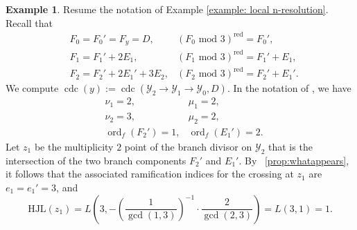 \documentclass[12pt]{amsart}
\numberwithin{equation}{section}
\theoremstyle{definition}
\newtheorem{example}[equation]{Example}
\newcommand{\padma}[1]{{\color{Magenta} \sf $\clubsuit\clubsuit\clubsuit$ Padma: [#1]}}
\newcommand{\andrew}[1]{{\color{Green} \sf $\diamondsuit\diamondsuit\diamondsuit$ Andrew: [#1]}}
\newcommand{\connor}[1]{{\color{Orange} \sf $\diamondsuit\diamondsuit\diamondsuit$ Connor: [#1]}}
\newcommand{\mc}[1]{\mathcal{#1}}
\newcommand{\Y}{\mathcal{Y}}
\newcommand{\tx}[1]{\text{#1}}
\DeclareMathOperator{\cdc}{cdc}
\DeclareMathOperator{\ord}{ord}
\begin{document}
\begin{example}\label{example: cdc} 
    Resume the notation of Example \ref{example: local n-resolution}. Recall that
    \begin{align*}
     &F_0=F_0'=F_y=D, &(F_0\tx{ mod }3)^\tx{red}=F_0', \\
     &F_1=F_1'+2E_1, &(F_1\tx{ mod }3)^\tx{red}=F_1'+E_1, \\
     &F_2=F_2'+2E_1'+3E_2, &(F_2\tx{ mod }3)^\tx{red}=F_2'+E_1'.
    \end{align*} 
    We compute $\cdc(y):=\cdc(\Y_2\to\Y_1\to\Y_0,D)$. In the notation of , we have
    \begin{align*}
     &\nu_1 = 2, &\mu_1=2, \\
     &\nu_2=3, &\mu_2=2,\\
     &\ord_f(F_2') = 1,  &\ord_f(E_1') = 2.
    \end{align*}
Let $z_1$ be the multiplicity $2$ point of the branch divisor on $\mc{Y}_2$ that is the intersection of the two branch components $F_2'$ and $E_1'$. By ~\ref{prop:whatappears}, it follows that the associated ramification indices for the crossing at $z_1$ are $e_1=e_1'=3$, and 
\[\tx{HJL}(z_1)=L \left(3,-\left(\frac{1}{\gcd(1,3)} \right)^{-1}\cdot\frac{2}{\gcd(2,3)} \right)=L(3,1)=1.\] 
    

\end{example}
\end{document}
